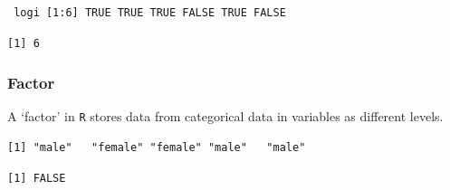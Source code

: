 \begin{verbatim}
 logi [1:6] TRUE TRUE TRUE FALSE TRUE FALSE
\end{verbatim}

\begin{Shaded}
\begin{Highlighting}[]
\end{Highlighting}
\end{Shaded}

\begin{verbatim}
[1] 6
\end{verbatim}

\hypertarget{factor}{%
\subsubsection{Factor}\label{factor}}

A `factor' in \texttt{R} stores data from categorical data in variables
as different levels.

\begin{Shaded}
\begin{Highlighting}[]
\StringTok{ }\NormalTok{(}\NormalTok{,}\NormalTok{,}\NormalTok{,}\NormalTok{,}\NormalTok{)}
\end{Highlighting}
\end{Shaded}

\begin{verbatim}
[1] "male"   "female" "female" "male"   "male"  
\end{verbatim}

\begin{Shaded}
\begin{Highlighting}[]
\end{Highlighting}
\end{Shaded}

\begin{verbatim}
[1] FALSE
\end{verbatim}

\begin{Shaded}
\begin{Highlighting}[]
\StringTok{ }

\end{Highlighting}
\end{Shaded}

